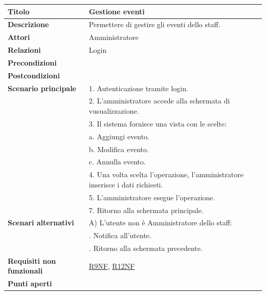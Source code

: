\documentclass[a4paper]{article}
\begin{document}
  \begin{center}
    \begin{tabularx}{1\textwidth}{l|X}
        \textbf{Titolo} & Gestione eventi \\
        \hline
        \textbf{Descrizione} & Permettere di gestire gli eventi dello staff. \\
        \hline
        \textbf{Attori} & Amministratore \\
        \hline
        \textbf{Relazioni} & Login \\
        \hline
        \textbf{Precondizioni} &  \\
        \hline
        \textbf{Postcondizioni} &  \\
        \hline
        \textbf{Scenario principale} & 1. Autenticazione tramite login. \\
                                     & 2. L'amministratore accede alla schermata di vusualizzazione. \\
                                     & 3. Il sistema fornisce una vista con le scelte: \\
                                     & \quad a. Aggiungi evento.\\
                                     & \quad b. Modifica evento.\\
                                     & \quad c. Annulla evento.\\
                                     & 4. Una volta scelta l'operazione, l'amministratore inserisce i dati richiesti. \\
                                     & 5. L'amministratore esegue l'operazione.\\
                                     & 7. Ritorno alla schermata principale.\\
        \hline
        \textbf{Scenari alternativi} & A) L'utente non è Amministratore dello staff: \\
                                     & \quad 1. Notifica all'utente. \\
                                     & \quad 2. Ritorno alla schermata precedente. \\
        \hline
        \textbf{Requisiti non funzionali} & \hyperlink{R9NF}{R9NF}, \hyperlink{R12NF}{R12NF} \\
        \hline
        \textbf{Punti aperti} & \\
        \hline
    \end{tabularx}
  \end{center}
\end{document}

